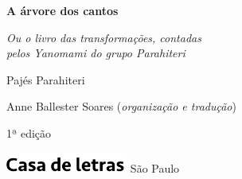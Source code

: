




\begingroup\thispagestyle{empty}\vspace*{.05\textheight} 

              {\formular
              \huge
              \noindent
              \textbf{A árvore dos cantos}\\
              
              \vspace{-0.5cm}
              
              }

              \vspace{0.5cm}

              \noindent{}\textit{Ou o livro das transformações, contadas\\pelos Yanomami do  grupo Parahiteri}

              \vspace{1cm}
              
              {\formular\Large
              \noindent{}Pajés Parahiteri
              }

              \vfill              

              {\small
              \noindent{}Anne Ballester Soares (\textit{organização e tradução})
              }

              \vspace{0.5cm}

              {\small\noindent{}1ª edição}

              \vfill\noindent\includegraphics[width=0.3\textwidth]{LOGO_CDL.png}
              \break{} 
              \smallskip
              {\fontsize{30}{40}%
              \scriptsize\noindent São Paulo\quad\the\year}

\endgroup
\pagebreak
